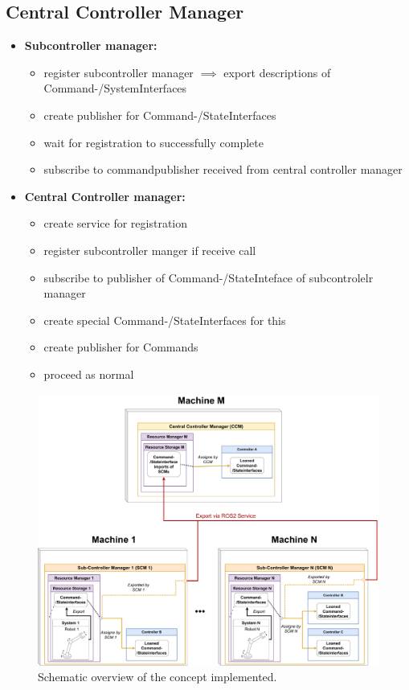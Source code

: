 \subsection{Central Controller Manager}
\begin{itemize}
    \item \textbf{Subcontroller manager:}
    \begin{itemize}
        \item register subcontroller manager $\implies$ export descriptions of Command-/SystemInterfaces
        \item create publisher for Command-/StateInterfaces
        \item wait for registration to successfully complete
        \item subscribe to commandpublisher received from central controller manager
    \end{itemize}
    \item \textbf{Central Controller manager:}
    \begin{itemize}
        \item create service for registration
        \item register subcontroller manger if receive call
        \item subscribe to publisher of Command-/StateInteface of subcontrolelr manager
        \item create special Command-/StateInterfaces for this
        \item create publisher for Commands
        \item proceed as normal
    \end{itemize}
\end{itemize}
\begin{figure}[htbp]
	\centering
	\includegraphics[width=1\textwidth]{Figures/C4/distributed_control.drawio.pdf}
	\caption{Schematic overview of the concept implemented.}
	\label{c4_fig_concept_overview}
\end{figure}

